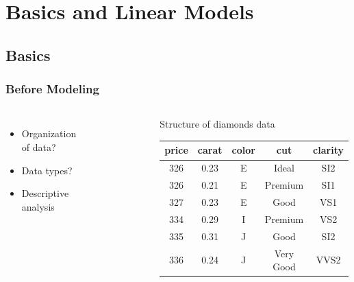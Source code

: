 \documentclass[
    utf8,
    aspectratio=169
]{beamer}  %
\begin{document}
\section{Basics and Linear Models}

\subsection{Basics}

\begin{frame}
	\frametitle{Before Modeling}
	\begin{columns}
		\begin{itemize}
			\item Organization of data?
			\item Data types?
			\item Descriptive analysis
		\end{itemize}
		\begin{figure}
			\includegraphics[width=0.6\textwidth]{pics/diamond.jpg}
		\end{figure}
		\begin{block}{\centering Structure of diamonds data}
		\begin{table}
			\begin{tabular}{ccccc}
				\hline
				price &carat &color &cut  & clarity \\
				\hline
				326&  0.23& E&     Ideal&     SI2   \\ 
				326&  0.21& E&     Premium&   SI1   \\ 
				327&  0.23& E&     Good  &    VS1   \\ 
				334&  0.29& I&     Premium&   VS2   \\ 
				335&  0.31& J&     Good  &    SI2   \\ 
				336&  0.24& J&     Very Good &VVS2 \\
				\hline
			\end{tabular}
		\end{table}
		\end{block}
	
		\begin{example}
		\end{example}
	\end{columns}
\end{frame}
\end{document}
